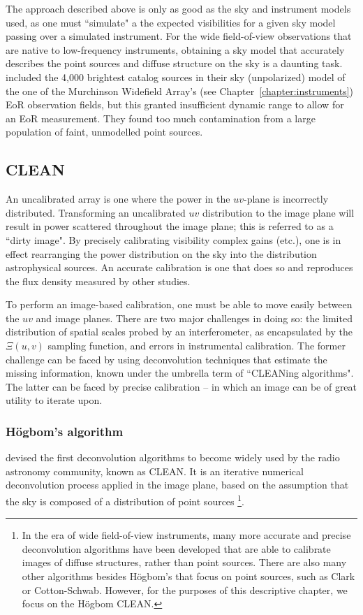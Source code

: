 The approach described above is only as good as the sky and instrument models used, as one must ``simulate" a the expected visibilities for a given sky model passing over a simulated instrument. For the wide field-of-view observations that are native to low-frequency instruments, obtaining a sky model that accurately describes the point sources and diffuse structure on the sky is a daunting task. \cite{Barry.16} included the 4,000 brightest catalog sources in their sky (unpolarized) model of the one of the Murchinson Widefield Array's (see Chapter~\ref{chapter:instruments}) EoR observation fields, but this granted insufficient dynamic range to allow for an EoR measurement. They found too much contamination from a large population of faint, unmodelled point sources.

\subsection{CLEAN}

An uncalibrated array is one where the power in the $uv$-plane is incorrectly distributed. Transforming an uncalibrated $uv$ distribution to the image plane will result in power scattered throughout the image plane; this is referred to as a ``dirty image". By precisely calibrating visibility complex gains (etc.), one is in effect rearranging the power distribution on the sky into the distribution astrophysical sources. An accurate calibration is one that does so and reproduces the flux density measured by other studies.

To perform an image-based calibration, one must be able to move easily between the $uv$ and image planes. There are two major challenges in doing so: the limited distribution of spatial scales probed by an interferometer, as encapsulated by the $\Xi(u,v)$ sampling function, and errors in instrumental calibration. The former challenge can be faced by using deconvolution techniques that estimate the missing information, known under the umbrella term of ``CLEANing algorithms". The latter can be faced by precise calibration -- in which an image can be of great utility to iterate upon. 

\subsubsection{H{\"o}gbom's algorithm}

\cite{Hogbom.74} devised the first deconvolution algorithms to become widely used by the radio astronomy community, known as CLEAN. It is an iterative numerical deconvolution process applied in the image plane, based on the assumption that the sky is composed of a distribution of point sources
\footnote{In the era of wide field-of-view instruments, many more accurate and precise deconvolution algorithms have been developed that are able to calibrate images of diffuse structures, rather than point sources. There are also many other algorithms besides H{\"o}gbom's that focus on point sources, such as Clark or Cotton-Schwab. However, for the purposes of this descriptive chapter, we focus on the H{\"o}gbom CLEAN.}.

